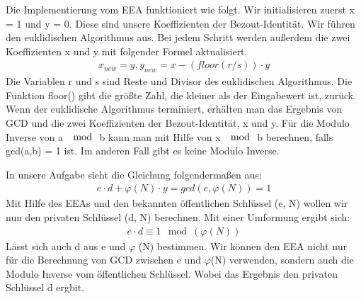 \documentclass[course=asp]{aspdoc}
\begin{document}
Die Implementierung vom EEA funktioniert wie folgt. Wir initialisieren zuerst x = 1 und y = 0. Diese sind unsere Koeffizienten der Bezout-Identität. Wir führen den euklidischen Algorithmus aus. Bei jedem Schritt werden außerdem die zwei Koeffizienten x und y mit folgender Formel aktualisiert. 
\begin{align}
	x_{new} = y, y_{new} = x - (floor(r/s)) \cdot y
\end{align} 
Die Variablen r und s sind Reste und Divisor des euklidischen Algorithmus. Die Funktion floor() gibt die größte Zahl, die kleiner als der Eingabewert ist, zurück. 
Wenn der euklidische Algorithmus terminiert, erhälten man das Ergebnis von GCD und die zwei Koeffizienten der Bezout-Identität, x und y.\cite{ExtendedEuclideanAlgorithm} Für die Modulo Inverse von a $\mod$ b kann man mit Hilfe von x $\mod$ b berechnen, falls gcd(a,b) = 1 ist. Im anderen Fall gibt es keine Modulo Inverse.
 
In unsere Aufgabe sieht die Gleichung folgendermaßen aus:
\begin{align}
	e\cdot d + \varphi (N)\cdot y = gcd(e, \varphi(N)) = 1
\end{align}
Mit Hilfe des EEAs und den bekannten öffentlichen Schlüssel (e, N) wollen wir nun den privaten Schlüssel (d, N) berechnen. Mit einer Umformung ergibt sich: 
\begin{align}	
	e\cdot d \equiv 1 \mod (\varphi(N))
\end{align}
Lässt sich auch d aus e und $\varphi $ (N) bestimmen. Wir können den EEA nicht nur für die Berechnung von GCD zwischen e und $\varphi $(N) verwenden, sondern auch die Modulo Inverse vom öffentlichen Schlüssel. Wobei das Ergebnis den privaten Schlüssel d ergbit.
\end{document}
